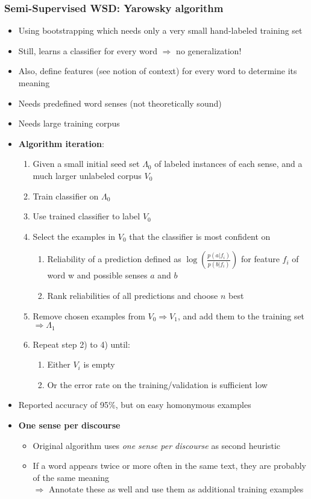 \subsubsection{Semi-Supervised WSD: Yarowsky algorithm}
\begin{itemize}
	\item Using bootstrapping which needs only a very small hand-labeled training set
	\item Still, learns a classifier for every word $\Rightarrow$ no generalization!
	\item Also, define features (see notion of context) for every word to determine its meaning
	\item Needs predefined word senses (not theoretically sound)
	\item Needs large training corpus
	\item \textbf{Algorithm iteration}: 
	\begin{enumerate}[start=0]
		\item Given a small initial seed set $\Lambda_0$ of labeled instances of each sense, and a much larger unlabeled corpus $V_0$
		\item Train classifier on $\Lambda_0$
		\item Use trained classifier to label $V_0$
		\item Select the examples in $V_0$ that the classifier is most confident on
		\begin{enumerate}
			\item Reliability of a prediction defined as $\log\left(\frac{p(a|f_i)}{p(b|f_i)}\right)$ for feature $f_i$ of word w and possible senses $a$ and $b$
			\item Rank reliabilities of all predictions and choose $n$ best
		\end{enumerate}
		\item Remove chosen examples from $V_0\Rightarrow V_1$, and add them to the training set $\Rightarrow\Lambda_1$
		\item Repeat step 2) to 4) until:
		\begin{enumerate}
			\item Either $V_i$ is empty
			\item Or the error rate on the training/validation is sufficient low
		\end{enumerate}
	\end{enumerate}
	\item Reported accuracy of 95\%, but on easy homonymous examples
	\item \textbf{One sense per discourse}
	\begin{itemize}
		\item Original algorithm uses \textit{one sense per discourse} as second heuristic
		\item If a word appears twice or more often in the same text, they are probably of the same meaning\\
		$\Rightarrow$ Annotate these as well and use them as additional training examples
	\end{itemize}
\end{itemize}
